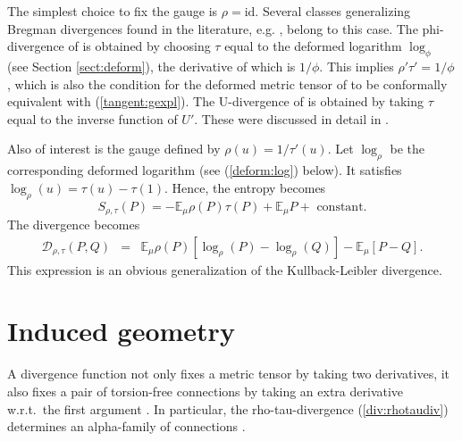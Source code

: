 \documentclass[graybox]{svmult}
\newcommand{\be}{\begin{equation}}
\newcommand{\ee}{\end{equation}}
\newcommand{\beq}{\begin{eqnarray}}
\newcommand{\eeq}{\end{eqnarray}}
\newcommand{\id}{\mbox{id}}
\newcommand{\Eo}{\mathbb E}
\newcommand{\Ddiv}{\mathcal{D}}
\begin{document}
The simplest choice to fix the gauge is $\rho=\id$.
Several classes generalizing Bregman divergences
found in the literature, e.g. \cite{NJ04,ES06},
belong to this case. The phi-divergence of \cite{NJ04} is obtained
by choosing $\tau$ equal to the deformed logarithm $\log_\phi$ (see Section \ref {sect:deform}),
the derivative of which is $1/\phi$. This implies $\rho'\tau'=1/\phi$,
which is also the condition for the deformed metric tensor of \cite{NJ04}
to be conformally equivalent with (\ref {tangent:gexpl}).
The U-divergence of \cite{ES06} is obtained by taking $\tau$ equal to the
inverse function of $U'$. These were discussed in detail in \cite{ZN17,NZ17,NZ18}.

Also of interest is the gauge defined by $\rho(u)=1/\tau'(u)$.
Let $\log_\rho$ be the corresponding deformed logarithm (see (\ref {deform:log}) below).
It satisfies $\log_\rho(u)=\tau(u)-\tau(1)$. Hence, the entropy becomes
\be
S_{\rho,\tau}(P)=-\Eo_\mu\rho(P)\tau(P)+\Eo_\mu P+\mbox{ constant}.
\nonumber\ee
The divergence becomes
\beq
\Ddiv _{\rho,\tau}(P,Q)
&=&
\Eo_\mu\rho(P)\left[\log_\rho(P)-\log_\rho(Q)\right]-\Eo_\mu\left[P-Q\right].
\nonumber
\eeq
This expression is an obvious generalization of the Kullback-Leibler divergence.


\section{Induced geometry}
\label{sect:geometry}

A divergence function not only fixes a metric tensor by taking two derivatives,
it also fixes a pair of torsion-free connections by taking an extra
derivative w.r.t.~the first argument
\cite{eguchi1983} \cite{eguchi1985}. In particular,
the rho-tau-divergence  (\ref {div:rhotaudiv}) determines an alpha-family of
connections \cite{zhang2004a,zhang13,NZ17}.
\end{document}
